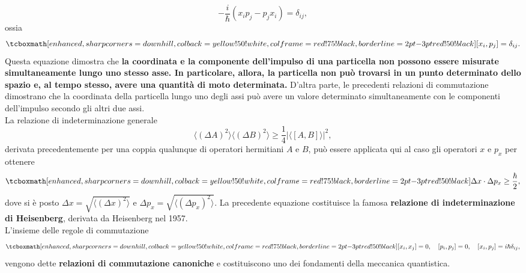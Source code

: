 \documentclass[a4paper,12pt,oneside]{book}
\begin{document}
	\begin{equation}
		-\frac{i}{\hbar}\left( x_ip_j-p_jx_i\right) =\delta _{ij},
	\end{equation}
ossia
	\begin{equation}
		\tcboxmath[enhanced,sharp corners=downhill ,colback=yellow!50!white,colframe=red!75!black, borderline={2pt}{-3pt}{red!50!black}]{
			\left[ x_i, p_j \right] =\delta _{ij}.
			}
	\end{equation}
Questa equazione dimostra che \textbf{la coordinata e la componente dell'impulso di una particella non possono essere misurate simultaneamente lungo uno stesso asse. In particolare, allora, la particella non può trovarsi in un punto determinato dello spazio e, al tempo stesso, avere una quantità di moto determinata.} D'altra parte, le precedenti relazioni di commutazione dimostrano che la coordinata della particella lungo uno degli assi può avere un valore determinato simultaneamente con le componenti dell'impulso secondo gli altri due assi.\\

La relazione di indeterminazione generale
	\begin{equation}
		\langle \left( \Delta A\right)^2\rangle \langle \left( \Delta B\right)^2\rangle \geq \frac{1}{4}\vert \langle \left[A,B\right] \rangle \vert ^2 ,
	\end{equation}
derivata precedentemente per una coppia qualunque di operatori hermitiani $A$ e $B$, può essere applicata qui al caso gli operatori $x$ e $p_x$ per ottenere
	\begin{equation}
		\tcboxmath[enhanced,sharp corners=downhill ,colback=yellow!50!white,colframe=red!75!black, borderline={2pt}{-3pt}{red!50!black}]{
			\Delta x \cdot \Delta p_x \geq \frac{\hbar}{2} ,
			}
	\end{equation}
dove si è posto $\Delta x = \sqrt{\langle\left(\Delta x\right) ^2\rangle}$ e $\Delta p_x = \sqrt{\langle\left(\Delta p_x\right) ^2\rangle}$. La precedente equazione costituisce la famosa \textbf{relazione di indeterminazione di Heisenberg}, derivata da Heisenberg nel 1957.\\

L'insieme delle regole di commutazione
	\begin{equation}
		\tcboxmath[enhanced,sharp corners=downhill ,colback=yellow!50!white,colframe=red!75!black, borderline={2pt}{-3pt}{red!50!black}]{
			\left[ x_i, x_j\right]=0, \quad \left[ p_i, p_j\right]=0, \quad \left[ x_i, p_j\right]=i\hbar \delta _{ij},
			} 
	\end{equation}
vengono dette \textbf{relazioni di commutazione canoniche} e costituiscono uno dei fondamenti della meccanica quantistica.\\
\end{document}
